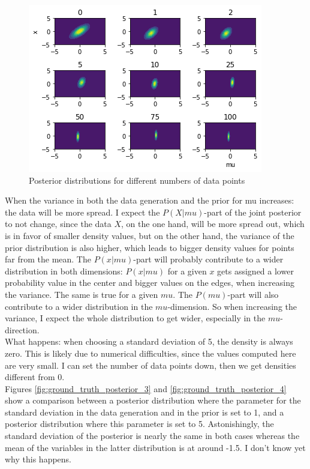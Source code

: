 \documentclass{article}
\begin{document}
\begin{figure}
	\includegraphics[width=\textwidth]{images/posterior_different_data_sizes.png}
	\caption[Posterior distributions for different numbers of data points]{Posterior distributions for different numbers of data points}
	\label{fig:posterior_different_data_sizes}
\end{figure}
When the variance in both the data generation and the prior for mu increases: the data will be more spread. I expect the $P(X|mu)$-part of the joint posterior to not change, since the data $X$, on the one hand, will be more spread out, which is in favor of smaller density values, but on the other hand, the variance of the prior distribution is also higher, which leads to bigger density values for points far from the mean. The $P(x|mu)$-part will probably contribute to a wider distribution in both dimensions: $P(x|mu)$ for a given $x$ gets assigned a lower probability value in the center and bigger values on the edges, when increasing the variance. The same is true for a given $mu$. The $P(mu)$-part will also contribute to a wider distribution in the $mu$-dimension.
So when increasing the variance, I expect the whole distribution to get wider, especially in the $mu$-direction.
\\
What happens: when choosing a standard deviation of 5, the density is always zero. This is likely due to numerical difficulties, since the values computed here are very small.
I can set the number of data points down, then we get densities different from 0.
\\
Figures  \ref{fig:ground_truth_posterior_3} and \ref{fig:ground_truth_posterior_4} show a comparison between a posterior distribution where the parameter for the standard deviation in the data generation and in the prior is set to 1, and a posterior distribution where this parameter is set to 5. Astonishingly, the standard deviation of the posterior is nearly the same in both cases whereas the mean of the variables in the latter distribution is at around -1.5. I don't know yet why this happens. 
\end{document}

